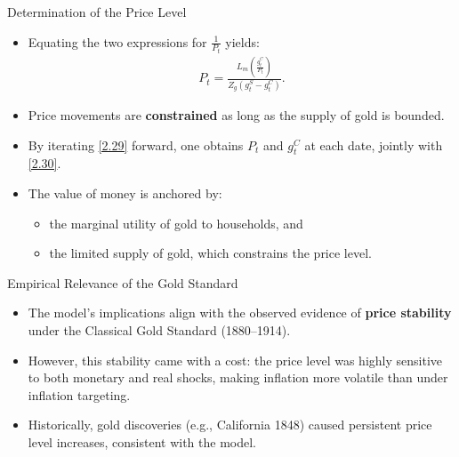 \documentclass[11pt,aspectratio=169]{beamer}
\begin{document}
\begin{frame}{Determination of the Price Level}
\small
\begin{itemize}

    \item Equating the two expressions for $\tfrac{1}{P_t}$ yields:
    \begin{align}
        P_t 
        = \frac{
            L_m\!\left(\tfrac{g_t^C}{P_t}\right)
        }{
            Z_g(g_t^S - g_t^C)
        }.
        \tag{2.30}\label{2.30}
    \end{align}

    \vspace{1em}

    \item Price movements are \textbf{constrained} as long as the supply of gold is bounded.

    \vspace{0.7em}

    \item By iterating \eqref{2.29} forward, one obtains $P_t$ and $g_t^C$ at each date, jointly with \eqref{2.30}.

    \vspace{0.7em}

    \item The value of money is anchored by:  
    \begin{itemize}
        \item the marginal utility of gold to households, and  
        \item the limited supply of gold, which constrains the price level.
    \end{itemize}

\end{itemize}
\end{frame}

\begin{frame}{Empirical Relevance of the Gold Standard}
\small
\begin{itemize}

    \item The model’s implications align with the observed evidence of  
    \textbf{price stability} under the Classical Gold Standard (1880–1914).

    \vspace{0.9em}

    \item However, this stability came with a cost:  
    the price level was highly sensitive to both monetary and real shocks,
    making inflation more volatile than under inflation targeting.

    \vspace{0.9em}

    \item Historically, gold discoveries (e.g., California 1848)  
    caused persistent price level increases, consistent with the model.
    
\end{itemize}
\end{frame}
\end{document}
